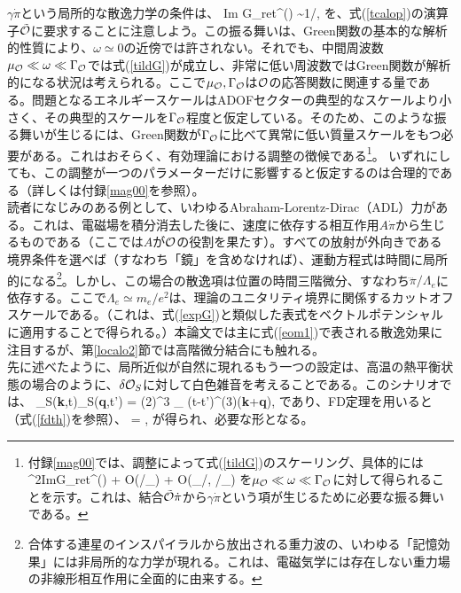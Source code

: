 $\gamma\dot\pi$という局所的な散逸力学の条件は、
\beq
\label{tildG}
{\rm Im} \tilde G_{\rm ret}^\calo (\omega) \sim 1/\omega,
\eeq
を、式(\ref{tcalop})の演算子$\tilde{{\cal O}}$に要求することに注意しよう。この振る舞いは、Green関数の基本的な解析的性質により、$\omega\simeq 0$の近傍では許されない。それでも、中間周波数$\mu_{\cal O} \ll \omega \ll \Gamma_{{\cal O}}$では式(\ref{tildG})が成立し、非常に低い周波数ではGreen関数が解析的になる状況は考えられる。ここで$\mu_{\cal O}, \Gamma_{\cal O}$は${\cal O}$の応答関数に関連する量である。問題となるエネルギースケールはADOFセクターの典型的なスケールより小さく、その典型的スケールを$\Gamma_{\cal O}$程度と仮定している。そのため、このような振る舞いが生じるには、Green関数が$\Gamma_{\cal O}$に比べて異常に低い質量スケールをもつ必要がある。これはおそらく、有効理論における調整の徴候である\footnote{付録\ref{mag00}では、調整によって式(\ref{tildG})のスケーリング、具体的には
\beq
\omega^2{\rm Im}{\tilde G}_{\rm ret}^{\calo}(\omega) \simeq \gamma {} + O(\omega/\Gamma_\calo) \simeq  \gamma\omega + O(\mu_\calo/\omega, \omega/\Gamma_\calo)
\eeq
を$\mu_{\cal O} \ll \omega \ll \Gamma_{{\cal O}}$に対して得られることを示す。これは、結合$\tilde{{\cal O}}\dot\pi$から$\gamma\dot\pi$という項が生じるために必要な振る舞いである。}。
いずれにしても、この調整が一つのパラメーターだけに影響すると仮定するのは合理的である（詳しくは付録\ref{mag00}を参照）。\\

読者になじみのある例として、いわゆるAbraham-Lorentz-Dirac（ADL）力がある。これは、電磁場を積分消去した後に、速度に依存する相互作用$A \dot\pi$から生じるものである（ここでは$A$が${\cal O}$の役割を果たす）。すべての放射が外向きである境界条件を選べば（すなわち「鏡」を含めなければ）、運動方程式は時間に局所的になる\cite{radre}\footnote{合体する連星のインスパイラルから放出される重力波の、いわゆる「記憶効果」には非局所的な力学が現れる\cite{memory}。これは、電磁気学には存在しない重力場の非線形相互作用に全面的に由来する。}。しかし、この場合の散逸項は位置の時間三階微分、すなわち$\dddot \pi/\Lambda_e$に依存する。ここで$\Lambda_e \simeq m_e/e^2$は、理論のユニタリティ境界に関係するカットオフスケールである。（これは、式(\ref{expG})と類似した表式をベクトルポテンシャルに適用することで得られる。）本論文では主に式(\ref{eom1})で表される散逸効果に注目するが、第\ref{localo2}節では高階微分結合にも触れる。\\

先に述べたように、局所近似が自然に現れるもう一つの設定は、高温の熱平衡状態の場合のように、$\delta{\cal O}_S$に対して白色雑音を考えることである。このシナリオでは、
\beq
\label{dbarh}
\langle \delta\calo_S({\bf{k}},t)\delta\calo_S({\bf{q}},t') \rangle = (2\pi)^3 \nu_{\calo} \delta(t-t')\delta^{(3)}({\bf{k}}+{\bf{q}}),
\eeq
であり、FD定理を用いると（式(\ref{fdth})を参照）、
\beq
\label{fdth2}
 \equiv \gamma = ,
\eeq
が得られ、必要な形となる。

